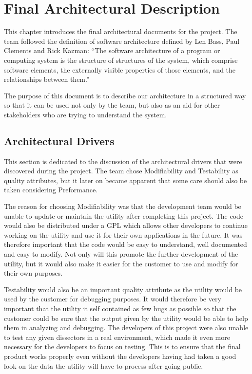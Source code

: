 \chapter{Final Architectural Description}
This chapter introduces the final architectural documents for the project. The team followed the definition of software architecture defined by Len Bass, Paul Clements and Rick Kazman: ``The software architecture of a program or computing
system is the structure of structures of the system, which comprise software elements, the externally visible properties of those elements, and the relationships between them.''\cite{Bass2003}

The purpose of this document is to describe our architecture in a structured way so that it can be used not only by the team, but also as an aid for other stakeholders who are trying to understand the system.

\section{Architectural Drivers}
This section is dedicated to the discussion of the architectural drivers that were discovered during the project.
The team chose Modifiability and Testability as quality attributes, but it later on became apparent that some care should also be taken considering Preformance.

The reason for choosing Modifiability was that the development team would be unable to update or maintain the \gls{utility} after completing this project. The code would also be distributed under a GPL which allows other developers to continue working on the utility and use it for their own applications in the future. It was therefore important that the code would be easy to understand, well documented and easy to modify. Not only will this promote the further development of the utility, but it would also make it easier for the customer to use and modify for their own purposes.

Testability would also be an important quality attribute as the \gls{utility} would be used by the customer for debugging purposes. It would therefore be very important that the utility it self contained as few bugs as possible so that the customer could be sure that the output given by the utility would be able to help them in analyzing and debugging. The developers of this project were also unable to test any given \glspl{dissector} in a real environment, which made it even more necessary for the developers to focus on testing. This is to ensure that the final product works properly even without the developers having had taken a good look on the data the utility will have to process after going public.

